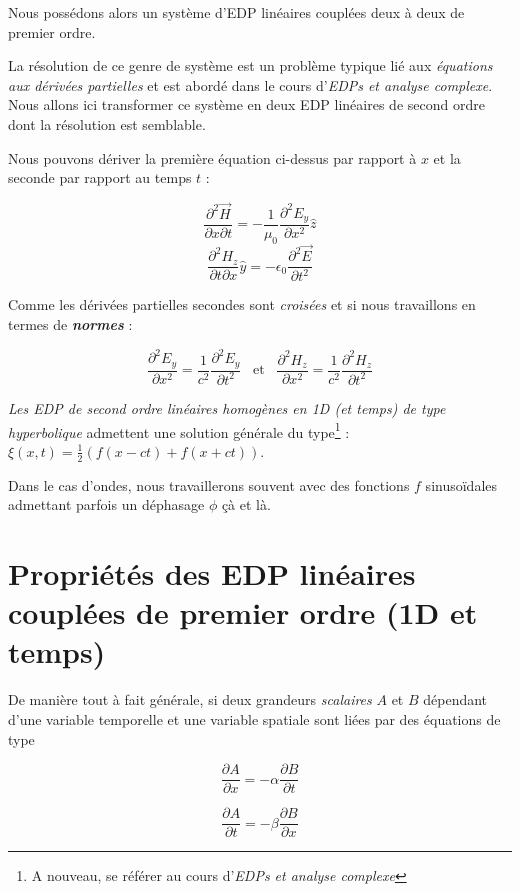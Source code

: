 \begin{itemize}
Nous possédons alors un système d'EDP linéaires couplées deux à deux de premier ordre.

La résolution de ce genre de système est un problème typique lié aux \textit{équations aux dérivées partielles} et est abordé dans le cours
d'\textit{EDPs et analyse complexe}. Nous allons ici transformer ce système en deux EDP linéaires de second ordre dont la résolution est semblable.

Nous pouvons dériver la première équation ci-dessus par rapport à $x$ et la seconde par rapport au temps $t$ : 

\[  \frac{\partial^{2} \vec{H}}{\partial x \partial t} = -\frac{1}{\mu_{0}} \frac{\partial^{2} E_{y}}{\partial x^{2}} \hat{z}\]
\[  \frac{\partial^{2} H_{z}}{\partial t \partial x} \hat{y} = - \epsilon_{0} \frac{\partial^{2} \vec{E}}{\partial t^{2}} \]

Comme les dérivées partielles secondes sont \textit{croisées} et si nous travaillons en termes de \textbf{\textit{normes}} :

\[\frac{\partial^{2} E_{y}}{\partial x^{2}} = \frac{1}{c^{2}}  \frac{\partial^{2} E_{y}}{\partial t^{2}} \hspace{10pt} \mbox{et} \hspace{10pt} \frac{\partial^{2} H_{z}}{\partial x^{2}} = \frac{1}{c^{2}}  \frac{\partial^{2} H_{z}}{\partial t^{2}}\]
\end{itemize}

\textit{Les EDP de second ordre linéaires homogènes en 1D (et temps) de type hyperbolique} admettent une solution générale du type\footnote{A nouveau, se référer au cours d'\textit{EDPs et analyse complexe}}  : 
$ \xi(x,t) = \frac{1}{2}(f(x-ct)+f(x+ct)) $.

Dans le cas d'ondes, nous travaillerons souvent avec des fonctions $f$ sinusoïdales admettant parfois un déphasage $\phi$ çà et là. 
 

\section{Propriétés des EDP linéaires couplées de premier ordre (1D et temps)}

De manière tout à fait générale, si deux grandeurs \textit{scalaires} $A$ et $B$ dépendant d'une variable temporelle et une variable spatiale sont 
liées par des équations de type 

\[\frac{\partial A}{\partial x} = -\alpha \frac{\partial B}{\partial t}\]

\[\frac{\partial A}{\partial t} = -\beta \frac{\partial B}{\partial x}\]

